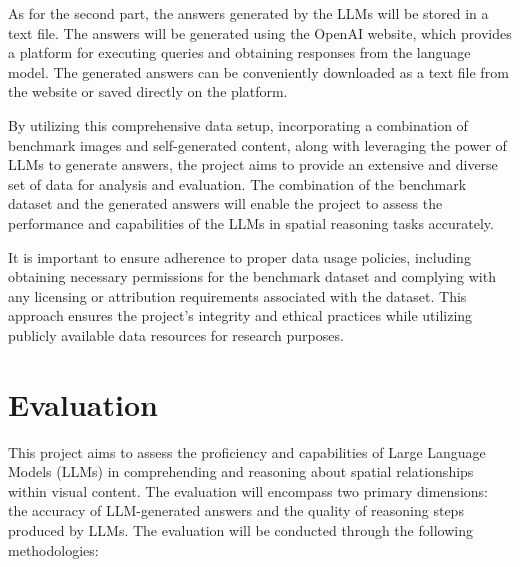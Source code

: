 \documentclass[journal,10pt]{IEEEtran}
\begin{document}
As for the second part, the answers generated by the LLMs will be stored in a text file. The answers will be generated using the OpenAI website, which provides a platform for executing queries and obtaining responses from the language model. The generated answers can be conveniently downloaded as a text file from the website or saved directly on the platform.

By utilizing this comprehensive data setup, incorporating a combination of benchmark images and self-generated content, along with leveraging the power of LLMs to generate answers, the project aims to provide an extensive and diverse set of data for analysis and evaluation. The combination of the benchmark dataset and the generated answers will enable the project to assess the performance and capabilities of the LLMs in spatial reasoning tasks accurately.

It is important to ensure adherence to proper data usage policies, including obtaining necessary permissions for the benchmark dataset and complying with any licensing or attribution requirements associated with the dataset. This approach ensures the project's integrity and ethical practices while utilizing publicly available data resources for research purposes.

\section{Evaluation}
This project aims to assess the proficiency and capabilities of Large Language Models (LLMs) in comprehending and reasoning about spatial relationships within visual content. The evaluation will encompass two primary dimensions: the accuracy of LLM-generated answers and the quality of reasoning steps produced by LLMs. The evaluation will be conducted through the following methodologies:
\end{document}

